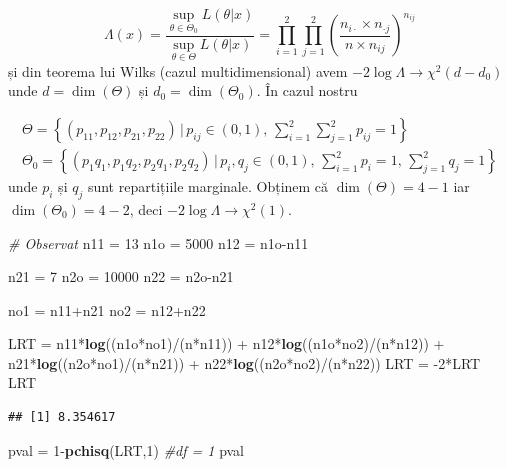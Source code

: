 \documentclass[]{article}
\newenvironment{Shaded}{\begin{snugshade}}{\end{snugshade}}
\newcommand{\KeywordTok}[1]{\textcolor[rgb]{0.13,0.29,0.53}{\textbf{{#1}}}}
\newcommand{\DecValTok}[1]{\textcolor[rgb]{0.00,0.00,0.81}{{#1}}}
\newcommand{\StringTok}[1]{\textcolor[rgb]{0.31,0.60,0.02}{{#1}}}
\newcommand{\CommentTok}[1]{\textcolor[rgb]{0.56,0.35,0.01}{\textit{{#1}}}}
\newcommand{\NormalTok}[1]{{#1}}
\begin{document}
\[
  \Lambda(x)=\frac{\sup_{\theta\in\Theta_0}L(\theta|x)}{\sup_{\theta\in\Theta}L(\theta|x)}=\prod_{i=1}^{2}\prod_{j=1}^{2}\left(\frac{n_{i\cdot}\times n_{\cdot j}}{n\times n_{ij}}\right)^{n_{ij}}
\] și din teorema lui Wilks (cazul multidimensional) avem
\(-2\log\Lambda\to\chi^2(d-d_0)\) unde \(d=\dim(\Theta)\) și
\(d_0=\dim(\Theta_0)\). În cazul nostru

\[
  \begin{array}{ll}
    \Theta = \left\{(p_{11},p_{12},p_{21},p_{22})\,|\,p_{ij}\in(0,1),\,\sum_{i=1}^{2}\sum_{j=1}^{2}p_{ij}=1\right\}\\
    \Theta_0 = \left\{(p_{1}q_1,p_{1}q_2,p_{2}q_1,p_{2}q_2)\,|\,p_{i},q_j\in(0,1),\,\sum_{i=1}^{2}p_{i}=1,\,\sum_{j=1}^{2}q_j=1\right\}
  \end{array}
\] unde \(p_i\) și \(q_j\) sunt repartițiile marginale. Obținem că
\(\dim(\Theta)=4-1\) iar \(\dim(\Theta_0)=4-2\), deci
\(-2\log\Lambda\to\chi^2(1)\).

\begin{Shaded}
\begin{Highlighting}[]
\CommentTok{# Observat}
\NormalTok{n11 =}\StringTok{ }\DecValTok{13}
\NormalTok{n1o =}\StringTok{ }\DecValTok{5000}
\NormalTok{n12 =}\StringTok{ }\NormalTok{n1o-n11}

\NormalTok{n21 =}\StringTok{ }\DecValTok{7}
\NormalTok{n2o =}\StringTok{ }\DecValTok{10000}
\NormalTok{n22 =}\StringTok{ }\NormalTok{n2o-n21}

\NormalTok{no1 =}\StringTok{ }\NormalTok{n11+n21}
\NormalTok{no2 =}\StringTok{ }\NormalTok{n12+n22}

\NormalTok{LRT =}\StringTok{ }\NormalTok{n11*}\KeywordTok{log}\NormalTok{((n1o*no1)/(n*n11)) +}\StringTok{ }\NormalTok{n12*}\KeywordTok{log}\NormalTok{((n1o*no2)/(n*n12)) +}\StringTok{ }
\StringTok{  }\NormalTok{n21*}\KeywordTok{log}\NormalTok{((n2o*no1)/(n*n21)) +}\StringTok{ }\NormalTok{n22*}\KeywordTok{log}\NormalTok{((n2o*no2)/(n*n22))}
\NormalTok{LRT =}\StringTok{ }\NormalTok{-}\DecValTok{2}\NormalTok{*LRT}
\NormalTok{LRT}
\end{Highlighting}
\end{Shaded}

\begin{verbatim}
## [1] 8.354617
\end{verbatim}

\begin{Shaded}
\begin{Highlighting}[]
\NormalTok{pval =}\StringTok{ }\DecValTok{1}\NormalTok{-}\KeywordTok{pchisq}\NormalTok{(LRT,}\DecValTok{1}\NormalTok{) }\CommentTok{#df = 1}
\NormalTok{pval}
\end{Highlighting}
\end{Shaded}
\end{document}
